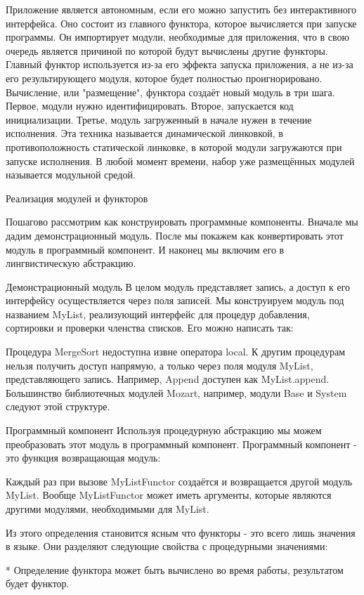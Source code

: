 Приложение является автономным, если его можно запустить без интерактивного интерфейса. Оно состоит из главного функтора, которое вычисляется при запуске программы. Он импортирует модули, необходимые для приложения, что в свою очередь является причиной по которой будут вычислены другие функторы. Главный функтор используется из-за его эффекта запуска приложения, а не из-за его результирующего модуля, которое будет полностью проигнорировано. Вычисление, или "размещение", функтора создаёт новый модуль в три шага. Первое, модули нужно идентифицировать. Второе, запускается код инициализации. Третье, модуль загруженный в начале нужен в течение исполнения. Эта техника называется динамической линковкой, в противоположность статической линковке, в которой модули загружаются при запуске исполнения. В любой момент времени, набор уже размещённых модулей называется модульной средой.

Реализация модулей и функторов

Пошагово рассмотрим как конструировать программные компоненты. Вначале мы дадим демонстрационный модуль. После мы покажем как конвертировать этот модуль в программный компонент. И наконец мы включим его в лингвистическую абстракцию.

Демонстрационный модуль
В целом модуль представляет запись, а доступ к его интерфейсу осуществляется через поля записей. Мы конструируем модуль под названием MyList, реализующий интерфейс для процедур добавления, сортировки и проверки членства списков. Его можно написать так:

Процедура MergeSort недоступна извне оператора local. К другим процедурам нельзя получить доступ напрямую, а только через поля модуля MyList, представляющего запись. Например, Append доступен как MyList.append. Большинство библиотечных модулей Mozart, например, модули Base и System следуют этой структуре.

Программный компонент
Используя процедурную абстракцию мы можем преобразовать этот модуль в программный компонент. Программный компонент - это функция возвращающая модуль:

Каждый раз при вызове MyListFunctor создаётся и возвращается другой модуль MyList. Вообще MyListFunctor может иметь аргументы, которые являются другими модулями, необходимыми для MyList.

Из этого определения становится ясным что функторы - это всего лишь значения в языке. Они разделяют следующие свойства с процедурными значениями:

* Определение функтора может быть вычислено во время работы, результатом будет функтор.

